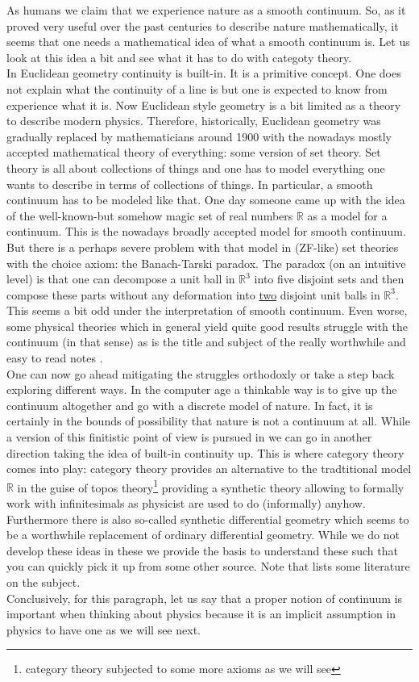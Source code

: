 As humans we claim that we experience nature as a smooth continuum. So, as it proved very useful over the past centuries to describe nature mathematically, it seems that one needs a mathematical idea of what a smooth continuum is. Let us look at this idea a bit and see what it has to do with categoty theory.
\\
In Euclidean geometry continuity is built-in. It is a primitive concept. One does not explain what the continuity of a line is but one is expected to know from experience what it is. Now Euclidean style geometry is a bit limited as a theory to describe modern physics. Therefore, historically, Euclidean geometry was gradually replaced by mathematicians around 1900 with the nowadays mostly accepted mathematical theory of everything: some version of set theory. Set theory is all about collections of things and one has to model everything one wants to describe in terms of collections of things. In particular, a smooth continuum has to be modeled like that. One day someone came up with the idea of the well-known-but somehow magic set of real numbers $\mathbb{R}$ as a model for a continuum. This is the nowadays broadly accepted model for smooth continuum.
\\
But there is a perhaps severe problem with that model in (ZF-like) set theories with the choice axiom: the Banach-Tarski paradox. The paradox (on an intuitive level) is that one can decompose a unit ball in $\mathbb{R}^{3}$ into five disjoint sets and then compose these parts without any {\glqq}deformation{\grqq} into \underline{two} disjoint unit balls in $\mathbb{R}^{3}$. This seems a bit odd under the interpretation of smooth continuum. Even worse, some physical theories which in general yield quite good results struggle with the continuum (in that sense) as is the title and subject of the really worthwhile and easy to read notes \cite{476fe2a3}.
\\
One can now go ahead mitigating the struggles orthodoxly or take a step back exploring different ways. In the computer age a thinkable way is to give up the continuum altogether and go with a discrete model of nature. In fact, it is certainly in the bounds of possibility that nature is not a continuum at all. While a version of this finitistic point of view is pursued in \cite{0b855cc5} we can go in another direction taking the idea of built-in continuity up. This is where category theory comes into play: category theory provides an alternative to the tradtitional model $\mathbb{R}$ in the guise of topos theory\footnote{category theory subjected to some more axioms as we will see} providing a synthetic theory allowing to formally work with infinitesimals as physicist are used to do (informally) anyhow. Furthermore there is also so-called synthetic differential geometry which seems to be a worthwhile replacement of ordinary differential geometry. While we do not develop these ideas in these we provide the basis to understand these such that you can quickly pick it up from some other source. Note that \cite{wiki-nlab0000} lists some literature on the subject.
\\
Conclusively, for this paragraph, let us say that a proper notion of continuum is important when thinking about physics because it is an implicit assumption in physics to have one as we will see next. 
